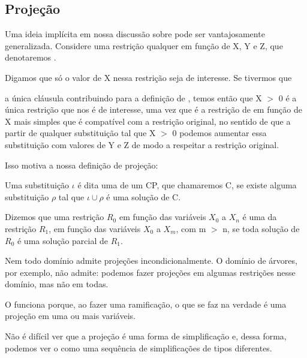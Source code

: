 \documentclass{article}
\begin{document}
\subsection{Projeção}

Uma ideia implícita em nossa discussão sobre  pode ser vantajosamente generalizada. Considere uma restrição
qualquer em função de X, Y e Z, que denotaremos
.

Digamos que só o valor de X nessa restrição seja de interesse. Se
tivermos que


 a única cláusula contribuindo para a definição de
, temos então que X $>$
0 é a única restrição que nos é de interesse, uma vez que é a
restrição de em função de X mais simples que é compatível com a
restrição original, no sentido de que a partir de qualquer
substituição tal que X $>$ 0 podemos aumentar essa substituição com
valores de Y e Z de modo a respeitar a restrição original.

Isso motiva a nossa definição de projeção:

\begin{definition}
  Uma substituição $\iota$ é dita uma  de
  um CP, que chamaremos C, se existe alguma substituição $\rho$ tal
  que $\iota \cup \rho$ é uma solução de C.
\end{definition}

\begin{definition}
  Dizemos que uma restrição $R_0$ em função das variáveis $X_0$ a
  $X_n$ é uma  da restrição $R_1$, em função das
  variáveis $X_0$ a $X_m$, com m $>$ n, se toda solução de $R_0$ é uma
  solução parcial de $R_1$.
\end{definition}

Nem todo domínio admite projeções incondicionalmente. O domínio de
árvores, por exemplo, não admite: podemos fazer projeções em algumas
restrições nesse domínio, mas não em todas.

O  funciona porque, ao fazer uma
ramificação, o que se faz na verdade é uma projeção em uma ou mais
variáveis.

Não é difícil ver que a projeção é uma forma de simplificação e, dessa
forma, podemos ver o  como uma sequência
de simplificações de tipos diferentes.
\end{document}
